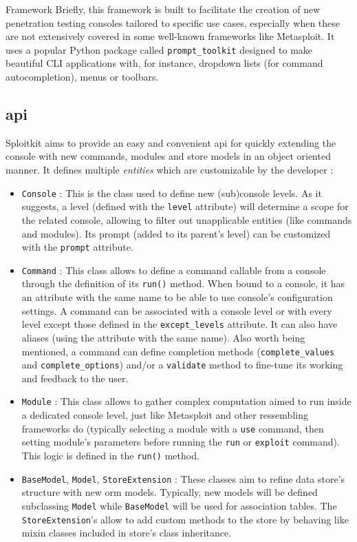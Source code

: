 \begin{chaptercover}{Framework}
Briefly, this framework is built to facilitate the creation of new penetration testing consoles tailored to specific use cases, especially when these are not extensively covered in some well-known frameworks like Metasploit. It uses a popular Python package called \texttt{prompt\_toolkit} \cite{prompt-toolkit} designed to make beautiful CLI applications with, for instance, dropdown lists (for command autocompletion), menus or toolbars.

\subsection{\acrlong{api}}

Sploitkit aims to provide an easy and convenient \acrshort{api} for quickly extending the console with new commands, modules and store models in an object oriented manner. It defines multiple \textit{entities} which are customizable by the developer :
\begin{itemize}
  \item \texttt{Console} : This is the class used to define new (sub)console levels. As it suggests, a level (defined with the \texttt{level} attribute) will determine a scope for the related console, allowing to filter out unapplicable entities (like commands and modules). Its prompt (added to its parent's level) can be customized with the \texttt{prompt} attribute.
  \item \texttt{Command} : This class allows to define a command callable from a console through the definition of its \texttt{run()} method. When bound to a console, it has an attribute with the same name to be able to use console's configuration settings. A command can be associated with a console level or with every level except those defined in the \texttt{except\_levels} attribute. It can also have aliases (using the attribute with the same name). Also worth being mentioned, a command can define completion methods (\texttt{complete\_values} and \texttt{complete\_options}) and/or a \texttt{validate} method to fine-tune its working and feedback to the user.
  \item \texttt{Module} : This class allows to gather complex computation aimed to run inside a dedicated console level, just like Metasploit and other ressembling frameworks do (typically selecting a module with a \texttt{use} command, then setting module's parameters before running the \texttt{run} or \texttt{exploit} command). This logic is defined in the \texttt{run()} method.
  \item \texttt{BaseModel}, \texttt{Model}, \texttt{StoreExtension} : These classes aim to refine data store's structure with new \acrshort{orm} models. Typically, new models will be defined subclassing \texttt{Model} while \texttt{BaseModel} will be used for association tables. The \texttt{StoreExtension}'s allow to add custom methods to the store by behaving like mixin classes included in store's class inheritance.
\end{itemize}


\end{chaptercover}
